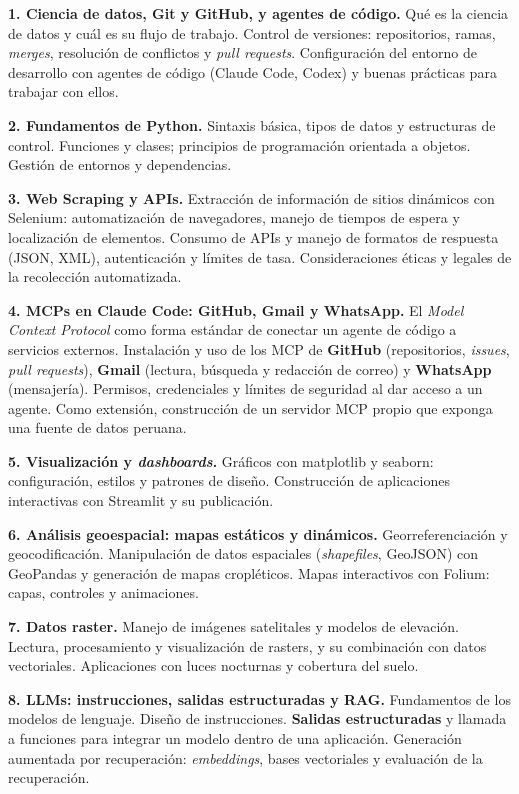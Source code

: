 \documentclass[11pt]{article}
\begin{document}
\textbf{1. Ciencia de datos, Git y GitHub, y agentes de c\'odigo.}
Qu\'e es la ciencia de datos y cu\'al es su flujo de trabajo. Control de versiones: repositorios, ramas, \emph{merges}, resoluci\'on de conflictos y \emph{pull requests}. Configuraci\'on del entorno de desarrollo con agentes de c\'odigo (Claude Code, Codex) y buenas pr\'acticas para trabajar con ellos.

\textbf{2. Fundamentos de Python.}
Sintaxis b\'asica, tipos de datos y estructuras de control. Funciones y clases; principios de programaci\'on orientada a objetos. Gesti\'on de entornos y dependencias.

\textbf{3. Web Scraping y APIs.}
Extracci\'on de informaci\'on de sitios din\'amicos con Selenium: automatizaci\'on de navegadores, manejo de tiempos de espera y localizaci\'on de elementos. Consumo de APIs y manejo de formatos de respuesta (JSON, XML), autenticaci\'on y l\'imites de tasa. Consideraciones \'eticas y legales de la recolecci\'on automatizada.

\textbf{4. MCPs en Claude Code: GitHub, Gmail y WhatsApp.}
El \emph{Model Context Protocol} como forma est\'andar de conectar un agente de c\'odigo a servicios externos. Instalaci\'on y uso de los MCP de \textbf{GitHub} (repositorios, \emph{issues}, \emph{pull requests}), \textbf{Gmail} (lectura, b\'usqueda y redacci\'on de correo) y \textbf{WhatsApp} (mensajer\'ia). Permisos, credenciales y l\'imites de seguridad al dar acceso a un agente. Como extensi\'on, construcci\'on de un servidor MCP propio que exponga una fuente de datos peruana.

\textbf{5. Visualizaci\'on y \emph{dashboards}.}
Gr\'aficos con matplotlib y seaborn: configuraci\'on, estilos y patrones de dise\~no. Construcci\'on de aplicaciones interactivas con Streamlit y su publicaci\'on.

\textbf{6. An\'alisis geoespacial: mapas est\'aticos y din\'amicos.}
Georreferenciaci\'on y geocodificaci\'on. Manipulaci\'on de datos espaciales (\emph{shapefiles}, GeoJSON) con GeoPandas y generaci\'on de mapas cropl\'eticos. Mapas interactivos con Folium: capas, controles y animaciones.

\textbf{7. Datos raster.}
Manejo de im\'agenes satelitales y modelos de elevaci\'on. Lectura, procesamiento y visualizaci\'on de rasters, y su combinaci\'on con datos vectoriales. Aplicaciones con luces nocturnas y cobertura del suelo.

\textbf{8. LLMs: instrucciones, salidas estructuradas y RAG.}
Fundamentos de los modelos de lenguaje. Dise\~no de instrucciones. \textbf{Salidas estructuradas} y llamada a funciones para integrar un modelo dentro de una aplicaci\'on. Generaci\'on aumentada por recuperaci\'on: \emph{embeddings}, bases vectoriales y evaluaci\'on de la recuperaci\'on.
\end{document}
